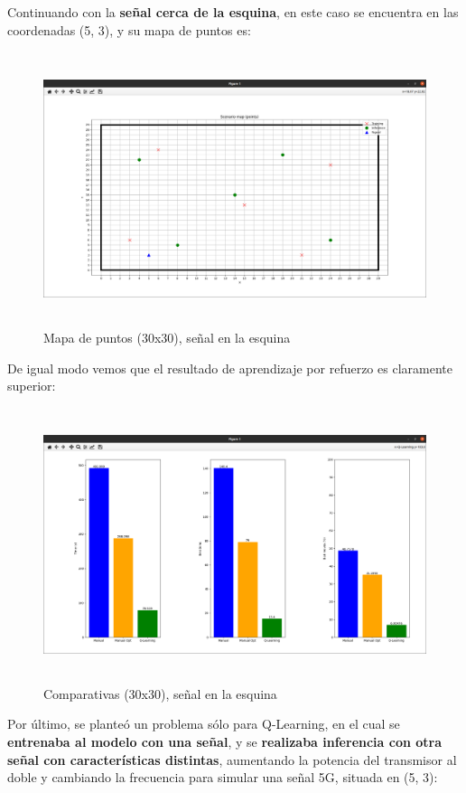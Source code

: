 Continuando con la \textbf{señal cerca de la esquina}, en este caso se encuentra en las coordenadas (5, 3), y su mapa de puntos es:\\

\begin{figure} [H]
    \begin{center}
    \includegraphics[height=8cm]{imagenes/cap4/23_mapa_p_esq_30.png}
    \end{center}
    \caption[Mapa de puntos (30x30), señal en la esquina]{Mapa de puntos (30x30), señal en la esquina}
    \label{fig:map_p_esq_30}
\end{figure}

De igual modo vemos que el resultado de aprendizaje por refuerzo es claramente superior:\\

\begin{figure} [H]
    \begin{center}
    \includegraphics[height=8cm]{imagenes/cap4/24_comp_esq_30.png}
    \end{center}
    \caption[Comparativas (30x30), señal en la esquina]{Comparativas (30x30), señal en la esquina}
    \label{fig:comp_esq_30}
\end{figure}
\newpage
Por último, se planteó un problema sólo para Q-Learning, en el cual se \textbf{entrenaba al modelo con una señal}, y se \textbf{realizaba inferencia con otra señal con características distintas}, aumentando la potencia del transmisor al doble y cambiando la frecuencia para simular una señal 5G, situada en (5, 3):\\

